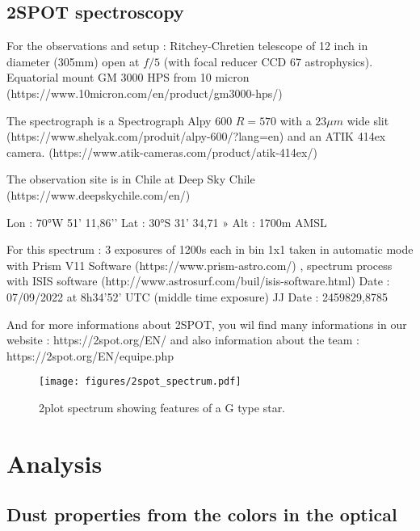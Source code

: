 \documentclass{aa}
\begin{document}
\subsection{2SPOT spectroscopy}

For the observations and setup : 
Ritchey-Chretien telescope of 12 inch in diameter (305mm) open at $f/5$ (with focal reducer CCD 67 astrophysics).
%
Equatorial mount GM 3000 HPS from 10 micron (https://www.10micron.com/en/product/gm3000-hps/)

The spectrograph is a Spectrograph Alpy 600 $R=570$ with a $23\mu m$ wide slit (https://www.shelyak.com/produit/alpy-600/?lang=en) and an ATIK 414ex camera. (https://www.atik-cameras.com/product/atik-414ex/)

The observation site is in Chile at Deep Sky Chile (https://www.deepskychile.com/en/) 

Lon : 70°W 51’ 11,86’'
Lat : 30°S 31’ 34,71 »
Alt : 1700m AMSL

For this spectrum : 3 exposures of 1200s each in bin 1x1 taken in automatic mode with Prism V11 Software (https://www.prism-astro.com/) , spectrum process with ISIS software (http://www.astrosurf.com/buil/isis-software.html)
Date : 07/09/2022 at 8h34’52’ UTC (middle time exposure) JJ Date : 2459829,8785

And for more informations about 2SPOT, you wil find many informations in our website : https://2spot.org/EN/
and also information about the team : https://2spot.org/EN/equipe.php


\begin{figure*}
   \begin{centering}
   \texttt{[image: figures/2spot\_spectrum.pdf]}
      \caption{2plot spectrum showing features of a G type star.
              }
              \label{fig:2spotspectrum}
              \end{centering}
       \end{figure*}




\section{Analysis}\label{sec:dustcloud}





\subsection{Dust properties from the colors in the optical}
\end{document}

